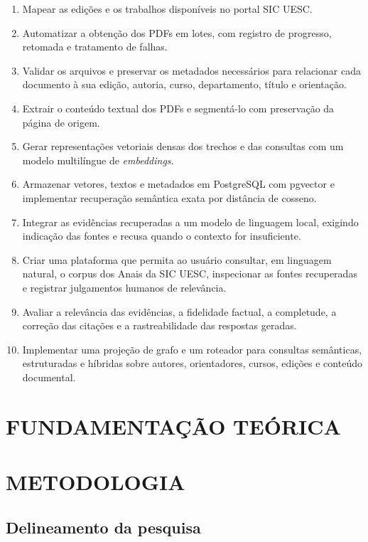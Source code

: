 \begin{enumerate}
    \item Mapear as edições e os trabalhos disponíveis no portal SIC UESC.
    \item Automatizar a obtenção dos PDFs em lotes, com registro de progresso, retomada e tratamento de falhas.
    \item Validar os arquivos e preservar os metadados necessários para relacionar cada documento à sua edição, autoria, curso, departamento, título e orientação.
    \item Extrair o conteúdo textual dos PDFs e segmentá-lo com preservação da página de origem.
    \item Gerar representações vetoriais densas dos trechos e das consultas com um modelo multilíngue de \textit{embeddings}.
    \item Armazenar vetores, textos e metadados em PostgreSQL com pgvector e implementar recuperação semântica exata por distância de cosseno.
    \item Integrar as evidências recuperadas a um modelo de linguagem local, exigindo indicação das fontes e recusa quando o contexto for insuficiente.
    \item Criar uma plataforma que permita ao usuário consultar, em linguagem natural, o corpus dos Anais da SIC UESC, inspecionar as fontes recuperadas e registrar julgamentos humanos de relevância.
    \item Avaliar a relevância das evidências, a fidelidade factual, a completude, a correção das citações e a rastreabilidade das respostas geradas.
    \item Implementar uma projeção de grafo e um roteador para consultas semânticas, estruturadas e híbridas sobre autores, orientadores, cursos, edições e conteúdo documental.
\end{enumerate}

\chapter{FUNDAMENTAÇÃO TEÓRICA}



\chapter{METODOLOGIA}

\section{Delineamento da pesquisa}

